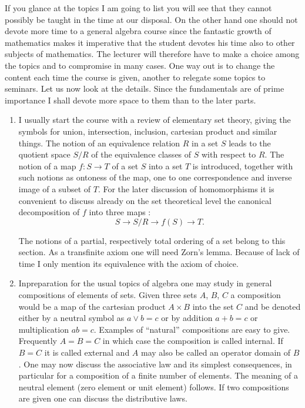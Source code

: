 If you glance at the topics I am going to list you will see that they
cannot possibly be taught in the time at our disposal. On the other
hand one should not devote more time to a general algebra course since
the fantastic growth of mathematics makes it imperative that the
student devotes his time also to other subjects of mathematics. The
lecturer will therefore have to make a choice among the topics and to
compromise in many cases. One way out is to change the content each
time the course is given, another to relegate some topics to
seminars. Let us now look at the details. Since the fundamentals are
of prime importance I shall devote more space to them than to the
later parts.

\begin{enumerate}[(1)]
\item I usually start the course with a review of elementary set
  theory, giving the symbols for union, intersection, inclusion,
  cartesian product and similar things. The notion of an equivalence
  relation $R$ in a set $S$ leads to the quotient space $S/R$ of the
  equivalence classes of $S$ with respect to $R$. The notion of a map
  $f: S \to T$ of a set $S$ into a set $T$ is introduced, together
  with such notions as ontoness of the map, one to one correspondence
  and inverse image of a subset of $T$. For the later discussion of
  homomorphisms it is convenient to discuss already on the set
  theoretical level the canonical decomposition of $f$ into three maps :
$$
S \to S/R \to f (S) \to T.
$$

The notions of a partial, respectively total ordering of a set belong
to this section. As a transfinite axiom one will need Zorn's
lemma. Because of lack of time I only mention its equivalence with the
axiom of choice.

\item In\pageoriginale preparation for the usual topics of algebra one may study in
  general compositions of elements of sets. Given three sets $A$, $B$,
  $C$ a composition would be a map of the cartesian product $A \times
  B$ into the set $C$ and be denoted either by a neutral symbol as $a
  \vee b = c$ or by addition $a + b = c$ or multiplication $ab
  =c$. Examples of ``natural'' compositions are easy to
  give. Frequently $A = B = C$ in which case the composition is called
  internal. If $B = C$ it is called external and $A$ may also be
  called an operator domain of $B$. One may now discuss the
  associative law and its simplest consequences, in particular for a
  composition of a finite number of elements. The meaning of a neutral
  element (zero element or unit element) follows. If two compositions
  are given one can discuss the distributive laws.


\end{enumerate}
